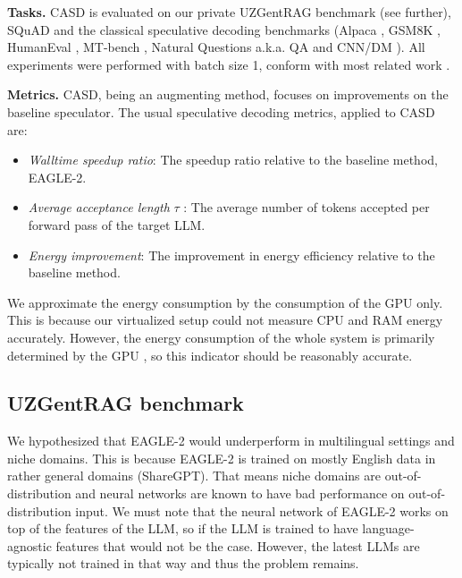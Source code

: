 \textbf{Tasks.} CASD is evaluated on our private UZGentRAG benchmark (see further), SQuAD \cite{rajpurkar2016squad} and the classical speculative decoding benchmarks (Alpaca \cite{alpaca}, GSM8K \cite{cobbe2021gsm8k}, HumanEval \cite{chen2021evaluating}, MT-bench \cite{zheng2023judging}, Natural Questions a.k.a. QA \cite{kwiatkowski2019natural} and CNN/DM \cite{nallapati2016abstractive}). All experiments were performed with batch size 1, conform with most related work \cite{kim2023speculative, leviathan2023fast, li2024eagle, zhou2023distillspec}.

\textbf{Metrics.} CASD, being an augmenting method, focuses on improvements on the baseline speculator. The usual speculative decoding metrics, applied to CASD are:
\begin{itemize}
  \item \emph{Walltime speedup ratio}: The speedup ratio relative to the baseline method, EAGLE-2.
  \item \emph{Average acceptance length} $\tau$ : The average number of tokens accepted per forward pass of the target LLM.
  \item \emph{Energy improvement}: The improvement in energy efficiency relative to the baseline method.
\end{itemize}

We approximate the energy consumption by the consumption of the GPU only. This is because our virtualized setup could not measure CPU and RAM energy accurately. However, the energy consumption of the whole system is primarily determined by the GPU \cite{li2024unseen}, so this indicator should be reasonably accurate.

\subsection{UZGentRAG benchmark}
We hypothesized that EAGLE-2 would underperform in multilingual settings and niche domains. This is because EAGLE-2 is trained on mostly English data in rather general domains (ShareGPT). That means niche domains are out-of-distribution and neural networks are known to have bad performance on out-of-distribution input. We must note that the neural network of EAGLE-2 works on top of the features of the LLM, so if the LLM is trained to have language-agnostic features that would not be the case. However, the latest LLMs are typically not trained in that way and thus the problem remains.


